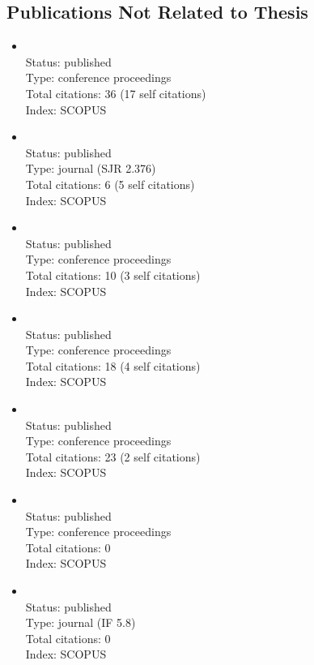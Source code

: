 \begin{refsection}
\section*{Publications Not Related to Thesis}
    \begin{itemize}
		\item{}\vspace{2mm}\\Status: published\\Type: conference proceedings\\Total citations: 36 (17 self citations)\\Index: SCOPUS
		\item{}\vspace{2mm}\\Status: published\\Type: journal (SJR 2.376)\\Total citations: 6 (5 self citations)\\Index: SCOPUS
		\item{}\vspace{2mm}\\Status: published\\Type: conference proceedings\\Total citations: 10 (3 self citations)\\Index: SCOPUS
		\item{}\vspace{2mm}\\Status: published\\Type: conference proceedings\\Total citations: 18 (4 self citations)\\Index: SCOPUS
		\item{}\vspace{2mm}\\Status: published\\Type: conference proceedings\\Total citations: 23 (2 self citations)\\Index: SCOPUS
		\item{}\vspace{2mm}\\Status: published\\Type: conference proceedings\\Total citations: 0\\Index: SCOPUS
		\item{}\vspace{2mm}\\Status: published\\Type: journal (IF 5.8)\\Total citations: 0\\Index: SCOPUS

\end{itemize}
\end{refsection}
